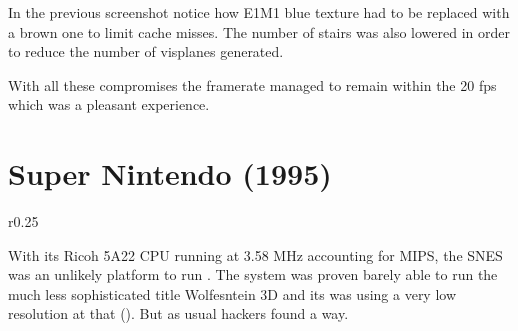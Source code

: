 \par
{}
\par
In the previous screenshot notice how E1M1 blue texture had to be replaced with a brown one to limit cache misses. The number of stairs was also lowered in order to reduce the number of visplanes generated.\\
\par
{}
\par
With all these compromises the framerate managed to remain within the 20 fps which was a pleasant experience.







\section{Super Nintendo (1995)}
\begin{wrapfigure}[11]{r}{0.25\textwidth}
\centering
{}
\end{wrapfigure}
With its Ricoh 5A22 CPU running at 3.58 MHz accounting for \fixme{} MIPS, the SNES was an unlikely platform to run \doom. The system was proven barely able to run the much less sophisticated title Wolfesntein 3D and its was using a very low resolution at that (\fixme{}). But as usual hackers found a way.\\
\par


